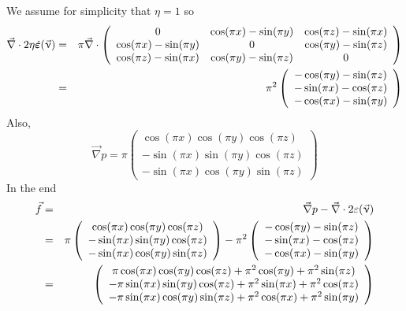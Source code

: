 We assume for simplicity that $\eta=1$ so 
\begin{eqnarray}
\vec\nabla\cdot 2\eta \dot{\bm \varepsilon}(\vec\upnu)
&=&
\pi
\vec\nabla\cdot 
\left(
\begin{array}{ccc}
0 &  \cos (\pi x) -\sin (\pi y)  & \cos (\pi z) -\sin (\pi x)\\
\cos (\pi x) -\sin (\pi y)  & 0 & \cos (\pi y)-\sin (\pi z)  \\
\cos (\pi z) -\sin (\pi x)  &  \cos (\pi y)-\sin (\pi z)  & 0
\end{array}
\right) \nonumber\\
&=& \pi^2
\left(
\begin{array}{ccc}
-\cos (\pi y) -\sin(\pi z) \\
-\sin (\pi x) -\cos(\pi z) \\
-\cos (\pi x) -\sin(\pi y)
\end{array}
\right) 
\end{eqnarray}
Also,
\[
\vec\nabla p = \pi
\left(
\begin{array}{ccc}
\cos (\pi x) \cos(\pi y) \cos (\pi z)\\
-\sin (\pi x) \sin(\pi y) \cos (\pi z)\\
-\sin (\pi x) \cos(\pi y) \sin (\pi z)
\end{array}
\right)
\]
In the end
\begin{eqnarray}
\vec{f} 
&=& \vec\nabla p - \vec\nabla \cdot 2 \varepsilon(\vec\upnu) \nonumber\\
&=& 
\pi
\left(
\begin{array}{ccc}
\cos (\pi x) \cos(\pi y) \cos (\pi z)\\
-\sin (\pi x) \sin(\pi y) \cos (\pi z)\\
-\sin (\pi x) \cos(\pi y) \sin (\pi z)
\end{array}
\right)
-
\pi^2
\left(
\begin{array}{ccc}
-\cos (\pi y) -\sin(\pi z) \\
-\sin (\pi x) -\cos(\pi z) \\
-\cos (\pi x) -\sin(\pi y)
\end{array}
\right)  \nonumber\\
&=& 
\left(
\begin{array}{ccc}
\pi \cos (\pi x) \cos(\pi y) \cos (\pi z) +\pi^2 \cos (\pi y) +\pi^2\sin(\pi z)\\
-\pi\sin (\pi x) \sin(\pi y) \cos (\pi z) +\pi^2 \sin (\pi x) +\pi^2\cos(\pi z)\\
-\pi\sin (\pi x) \cos(\pi y) \sin (\pi z) +\pi^2 \cos (\pi x) +\pi^2\sin(\pi y)
\end{array}
\right) 
\end{eqnarray}


